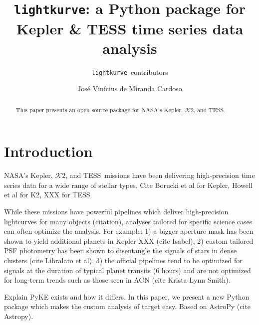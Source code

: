 \documentclass[twocolumn]{aastex62}
\newcommand{\KTWO}{$\mathcal{K}\mathit{2}$}
\newcommand{\tess}{TESS}
\newcommand{\lightkurve}{\texttt{lightkurve}}
\begin{document}
\title{\lightkurve: a Python package for Kepler \& TESS time series data analysis}


\author{\lightkurve~contributors}

\author{José Vinícius de Miranda Cardoso}

\begin{abstract}

    This paper presents an open source package for NASA's Kepler, \KTWO, and
    TESS.

\end{abstract}


\section{Introduction} \label{sec:intro}
NASA's Kepler, \KTWO, and \tess~missions have been delivering high-precision time
series data for a wide range of stellar types.
Cite Borucki et al for Kepler, Howell et al for K2, XXX for TESS.

While these missions have powerful pipelines which deliver high-precision
lightcurves for many objects (citation), analyses tailored for specific
science cases can often optimize the analysis.
For example:
1) a bigger aperture mask has been shown to yield additional planets in Kepler-XXX (cite Isabel),
2) custom tailored PSF photometry has been shown to disentangle the signals of stars in
dense clusters (cite Libralato et al),
3) the official pipelines tend to be optimized for signals at the duration of typical
planet transits (6 hours) and are not optimized for long-term trends such as those
seen in AGN (cite Krista Lynn Smith).

Explain PyKE exists and how it differs.
In this paper, we present a new Python package which makes the custom analysis
of target easy.  Based on AstroPy (cite Astropy).
\end{document}
